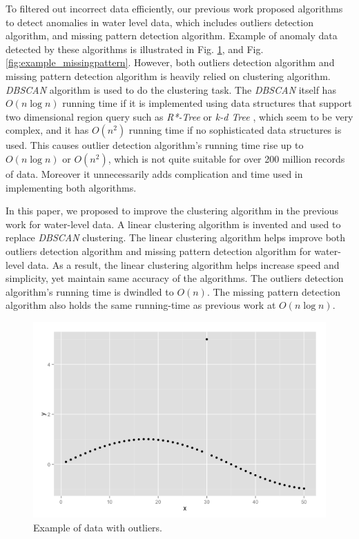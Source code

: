 \documentclass[conference]{IEEEtran}
\begin{document}
To filtered out incorrect data efficiently, our previous work \cite{markpeng2014controlling} proposed algorithms to detect anomalies in water level data, which includes outliers detection algorithm, and missing pattern detection algorithm. Example of anomaly data detected by these algorithms is illustrated in Fig. \ref{fig:example_outliers}, and Fig. \ref{fig:example_missingpattern}. However, both outliers detection algorithm and missing pattern detection algorithm is heavily relied on clustering algorithm. \textit{DBSCAN} algorithm \cite{ester1996density} is used to do the clustering task. The \textit{DBSCAN} itself has $O(n\log{n})$ running time if it is implemented using data structures that support two dimensional region query such as \textit{R*-Tree} \cite{beckmann1990r} or \textit{k-d Tree} \cite{bentley1975multidimensional}, which seem to be very complex, and it has $O(n^2)$ running time if no sophisticated data structures is used. This causes outlier detection algorithm's running time rise up to $O(n\log{n})$ or $O(n^2)$, which is not quite suitable for over 200 million records of data. Moreover it unnecessarily adds complication and time used in implementing both algorithms.

In this paper, we proposed to improve the clustering algorithm in the previous work for water-level data. A linear clustering algorithm is invented and used to replace \textit{DBSCAN} clustering. The linear clustering algorithm helps improve both outliers detection algorithm and missing pattern detection algorithm for water-level data. As a result, the linear clustering algorithm helps increase speed and simplicity, yet maintain same accuracy of the algorithms. The outliers detection algorithm's running time is dwindled to $O(n)$. The missing pattern detection algorithm also holds the same running-time as previous work at $O(n\log{n})$.

\begin{figure}
  \includegraphics[width=\linewidth]{figure1.png}
  \caption{Example of data with outliers.}
  \label{fig:example_outliers}
\end{figure}
\end{document}
